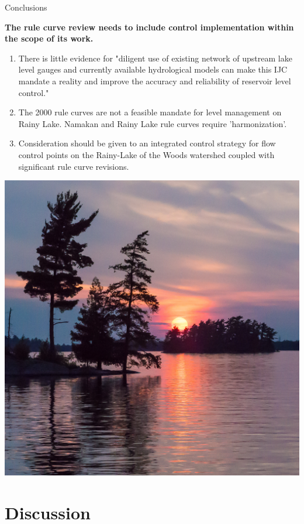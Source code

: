 \documentclass[compress,english]{beamer}
\begin{document}
\begin{frame}{Conclusions}

{\bf The rule curve review needs to include control implementation within the scope of its work.}

\begin{enumerate}

\item There is little evidence for "diligent use of existing network of upstream lake level gauges and currently available hydrological models can make this IJC mandate a reality and improve the accuracy and reliability of reservoir level control."

\item The 2000 rule curves are not a feasible mandate for level management on Rainy Lake. Namakan and Rainy Lake rule curves require 'harmonization'.

\item  Consideration should be given to an integrated control strategy for flow control points on the Rainy-Lake of the Woods watershed coupled with significant rule curve revisions.
	
\end{enumerate}

\end{frame}



{\usebackgroundtemplate%
	{\includegraphics[width=\paperwidth]{FloodedSunset}}
\section*{Discussion}
}
\end{document}
